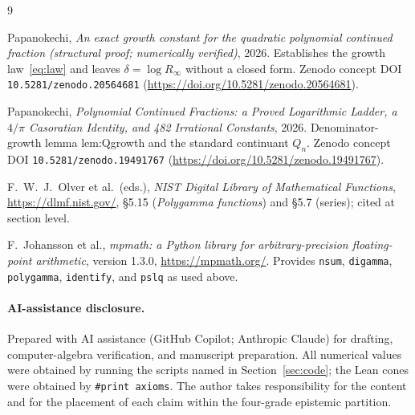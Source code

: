 \documentclass[11pt]{article}
\begin{document}
\begin{thebibliography}{9}

Papanokechi,
\emph{An exact growth constant for the quadratic polynomial continued fraction
(structural proof; numerically verified)}, 2026.
Establishes the growth law~\eqref{eq:law} and leaves $\delta=\log R_\infty$ without
a closed form. Zenodo concept DOI \texttt{10.5281/zenodo.20564681}
(\url{https://doi.org/10.5281/zenodo.20564681}).

Papanokechi,
\emph{Polynomial Continued Fractions: a Proved Logarithmic Ladder, a $4/\pi$
Casoratian Identity, and 482 Irrational Constants}, 2026.
Denominator-growth lemma \textsf{lem:Qgrowth} and the standard continuant $Q_n$.
Zenodo concept DOI \texttt{10.5281/zenodo.19491767}
(\url{https://doi.org/10.5281/zenodo.19491767}).

F.~W.~J.~Olver et al.\ (eds.),
\emph{NIST Digital Library of Mathematical Functions},
\url{https://dlmf.nist.gov/}, \S5.15 (\emph{Polygamma functions}) and \S5.7
(series); cited at section level.

F.~Johansson et al.,
\emph{mpmath: a Python library for arbitrary-precision floating-point arithmetic},
version 1.3.0, \url{https://mpmath.org/}. Provides \texttt{nsum}, \texttt{digamma},
\texttt{polygamma}, \texttt{identify}, and \texttt{pslq} as used above.

\end{thebibliography}

\paragraph{AI-assistance disclosure.}
Prepared with AI assistance (GitHub Copilot; Anthropic Claude) for drafting,
computer-algebra verification, and manuscript preparation. All numerical values were
obtained by running the scripts named in Section~\ref{sec:code}; the Lean cones were
obtained by \texttt{\#print axioms}. The author takes responsibility for the content
and for the placement of each claim within the four-grade epistemic partition.
\end{document}
